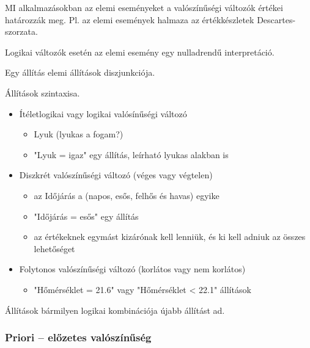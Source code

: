 MI alkalmazásokban az elemi eseményeket a valószínűségi változók értékei
határozzák meg.  Pl. az elemi események halmaza az értékkészletek
Descartes-szorzata.

Logikai változók esetén az elemi esemény egy nulladrendű interpretáció.

Egy állítás elemi állítások diszjunkciója.

\begin{tetel}
    Állítások szintaxisa.

    \begin{itemize}
        \item Ítéletlogikai vagy logikai valósínűségi változó
            \begin{itemize}
                \item Lyuk (lyukas a fogam?)
                \item "Lyuk = igaz" egy állítás, leírható lyukas alakban is
            \end{itemize}
        \item Diszkrét valószínűségi változó (véges vagy végtelen)
            \begin{itemize}
                \item az Időjárás a (napos, esős, felhős és havas) egyike
                \item "Időjárás = esős" egy állítás
                \item az értékeknek egymást kizárónak kell lenniük, és ki kell
                    adniuk az összes lehetőséget
            \end{itemize}
        \item Folytonos valószínűségi változó (korlátos vagy nem korlátos)
            \begin{itemize}
                \item "Hőmérséklet = 21.6" vagy "Hőmérséklet < 22.1" állítások
            \end{itemize}
    \end{itemize}
\end{tetel}

\begin{tetel}
    Állítások bármilyen logikai kombinációja újabb állítást ad.
\end{tetel}

\subsubsection{Priori -- előzetes valószínűség}

